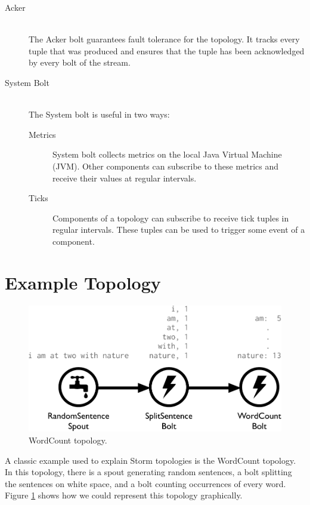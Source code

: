 \documentclass[bsc,logo,frontabs,twoside,singlespacing,normalheadings,parskip]{infthesis}\usepackage[]{graphicx}\usepackage[]{color}
\begin{document}
\begin{description}
	\item[Acker] \hfill \\
	The Acker bolt guarantees fault tolerance for the topology. It tracks every tuple that was produced and ensures that the tuple has been acknowledged by every bolt of the stream.
	\item[System Bolt] \hfill \\
	The System bolt is useful in two ways:
	\begin{description}
		\item[Metrics] System bolt collects metrics on the local Java Virtual Machine (JVM). Other components can subscribe to these metrics and receive their values at  regular intervals.
		\item[Ticks] Components of a topology can subscribe to receive tick tuples in regular intervals. These tuples can be used to trigger some event of a component.
	\end{description}
\end{description}

\section{Example Topology}
\label{sec:example_topology}

\begin{figure}[!htb]
	\centering
	\includegraphics[scale=0.475]{pdf/wordcount_topology.pdf}
	\caption{WordCount topology.}
	\label{fig:wordcount_topology}
\end{figure}

A classic example used to explain Storm topologies is the WordCount topology. In this topology, there is a spout generating random sentences, a bolt splitting the sentences on white space, and a bolt counting occurrences of every word. Figure \ref{fig:wordcount_topology} shows how we could represent this topology graphically.
\end{document}
